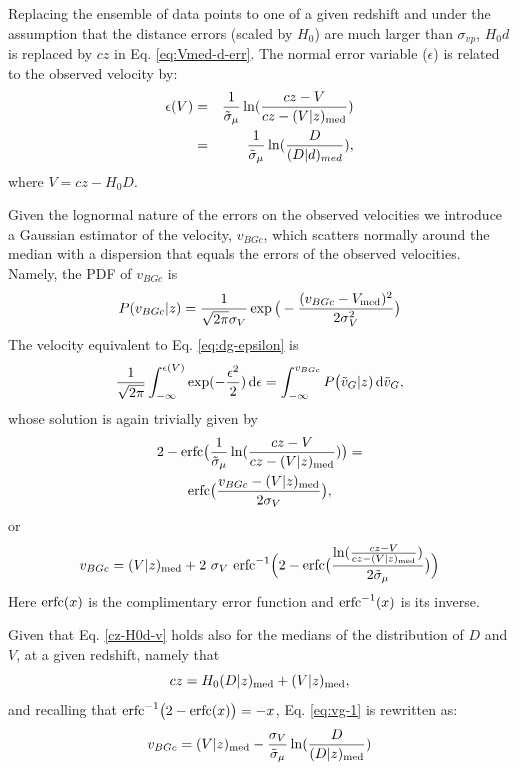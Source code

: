 \documentclass[useAMS,usenatbib]{mn2e}
\renewcommand{\d}[1]{\ensuremath{\operatorname{d}\!{#1}}}
\begin{document}
Replacing the ensemble of data points to one of a given redshift and under the assumption that the distance errors (scaled by $H_0$) are much larger than $\sigma_{vp}$, $H_0 d$ is replaced by $cz$ in Eq. \ref{eq:Vmed-d-err}. The normal error variable ($\epsilon$) is related to  the observed velocity by:\\
\begin{eqnarray}
\epsilon(V)&=&{1\over\tilde{\sigma}_\mu}\ln({cz -V\over cz - (V\vert z)_{\rm med}})\\
                 &=&{1\over\tilde{\sigma}_\mu}\ln({D\over  (D|d)_{med}}), \nonumber
\label{eq:epsilon-V}
\end{eqnarray}
where $V=cz-H_0D$.

Given the lognormal nature of the errors on the observed velocities we introduce a Gaussian estimator of the velocity, $v_{BGc}$, which scatters normally around the median with a dispersion that equals the errors of the observed velocities. Namely, the PDF of $v_{BGc}$ is
\begin{equation}
P(v_{BGc}\vert z)={1\over\sqrt{2\pi}\sigma_V}\exp\big(-{(v_{BGc}-V_{\rm med})^2\over 2 \sigma{_V^2}}\big)
\label{eq:P-vG}
\end{equation}
The velocity equivalent to   Eq. \ref{eq:dg-epsilon} is\\
\begin{equation}
{1\over\sqrt{2\pi}}\int_{-\infty}^{\epsilon(V)}  \exp(-{\epsilon^2\over 2}) \d{\epsilon}  =
\int_{-\infty}^{v_{BGc}} P\big( \tilde{v}_G\vert z)\d{\tilde{v}_G},
\label{eq:vG-V}
\end{equation}
whose  solution is again trivially given by\\
\begin{multline}
2-{\rm erfc}\big({1\over\tilde{\sigma}_\mu}\ln( {cz -V\over cz - (V\vert z)_{\rm med}} ) \big)=\\
{\rm erfc}\big({v_{BGc}-(V\vert z)_{\rm med}\over 2\sigma_V}  \big), 
\label{eq:erfc-vG}
\end{multline}
or
\begin{equation}
v_{BGc}=(V\vert z)_{\rm med} + 2\ \sigma_V \ {\rm erfc}^{-1}
\Big(2-{\rm erfc}\big(  {\ln({cz -V\over cz - (V\vert z)_{\rm med}} ) \over 2\tilde{\sigma}_\mu}\big) \Big)
 \label{eq:vg-1}
 \end{equation}
 Here ${\rm erfc}(x)$ is the complimentary error function and ${\rm erfc}^{-1}(x)$ is its inverse. 
 
 Given that Eq. \ref{cz-H0d-v} holds also for the medians of the distribution of $D$ and $V$, at a given redshift, namely that 
  \begin{equation}
cz =  H_0 (D\vert z)_{\rm med} +(V\vert z)_{\rm med}, 
\label{cz-H0d-v-med}
\end{equation}
and recalling that $ {\rm erfc}^{-1}\big(2-{\rm erfc}(x)\big)=-x$, 
Eq. \ref{eq:vg-1} is rewritten as:
\begin{equation}
v_{BGc}=(V\vert z)_{\rm med} - {\sigma_V  \over  \tilde{\sigma}_\mu}  
  \ln({D\over  (D\vert z)_{\rm med}} ) 
 \label{eq:vg}
\end{equation}
\end{document}

